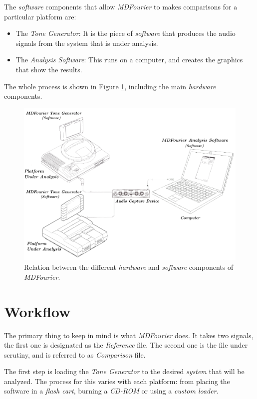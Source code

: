 \documentclass[10pt,a4paper]{report}
\begin{document}
The \textit{software} components that allow \textit{MDFourier} to makes comparisons for a particular platform are:

\begin{itemize}
	\item The \textit{Tone Generator}: It is the piece of \textit{software} that produces the audio signals from the system that is under analysis. 
	\item The \textit{Analysis Software}: This runs on a computer, and creates the graphics that show the results. 
\end{itemize}

The whole process is shown in Figure \ref{fig:mdfourierworkflow}, including the main \textit{hardware} components.

\begin{figure}[H]
	\centering
	\includegraphics[width=0.8\linewidth]{images/howitworks/MDFourierWorkFlow.png}
	\caption[Workflow]{Relation between the different \textit{hardware} and \textit{software} components of \textit{MDFourier}.}
	\label{fig:mdfourierworkflow}
\end{figure}

\section{Workflow}

The primary thing to keep in mind is what \textit{MDFourier} does. It takes two signals, the first one is designated as the \textit{Reference} file. The second one is the file under scrutiny, and is referred to as \textit{Comparison} file. 

The first step is loading the \textit{Tone Generator} to the desired \textit{system} that will be analyzed. The process for this varies with each platform: from placing the software in a \textit{flash cart}, burning a \textit{CD-ROM} or using a \textit{custom loader}.
\end{document}
